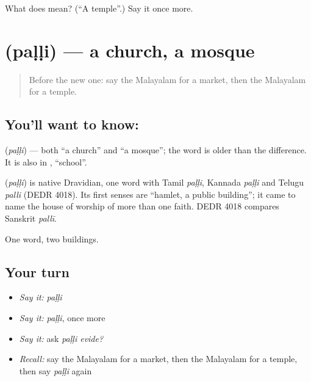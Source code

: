 \begin{tcolorbox}[breakable,colback=teal!4,colframe=teal!35!black,title={Before you move on}]
What does  mean? (\textquotedblleft{}A temple\textquotedblright{}.) Say it once more.
\end{tcolorbox}
\section[\texorpdfstring{\ml{പള്ളി} (paḷḷi)}{പള്ളി (paḷḷi)}]{ (paḷḷi) — a church, a mosque}

\label{lesson:ML-C135-church}



\begin{quote}
Before the new one: say the Malayalam for a market, then the Malayalam for a temple.
\end{quote}

\subsection*{You'll want to know: }
\textbf{} (\emph{paḷḷi}) — both \textquotedblleft{}a church\textquotedblright{} and \textquotedblleft{}a mosque\textquotedblright{}; the word is older than the difference. It is also in \textbf{}, \textquotedblleft{}school\textquotedblright{}.

\begin{cousinweb}
\textbf{} (\emph{paḷḷi}) is native Dravidian, one word with Tamil \emph{paḷḷi}, Kannada \emph{paḷḷi} and Telugu \emph{palli} (DEDR 4018). Its first senses are \textquotedblleft{}hamlet, a public building\textquotedblright{}; it came to name the house of worship of more than one faith. DEDR 4018 compares Sanskrit \emph{pallī}.
\end{cousinweb}

\begin{grammarlens}[title={What you've built}]
One word, two buildings.
\end{grammarlens}

\subsection*{Your turn}
\begin{itemize}
\raggedright
  \item \emph{Say it:} \emph{paḷḷi}
  \item \emph{Say it:} \emph{paḷḷi}, once more
  \item \emph{Say it:} ask \emph{paḷḷi evide?}
  \item \emph{Recall:} say the Malayalam for a market, then the Malayalam for a temple, then say \emph{paḷḷi} again
\end{itemize}

